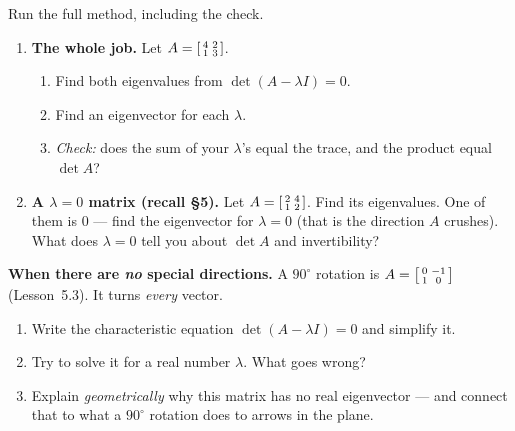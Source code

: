 \documentclass[10pt]{article}
\begin{document}
\begin{tcolorbox}[colback=white, colframe=black!40, title=\textbf{Tier A --- Approaching Proficiency},
    fonttitle=\bfseries, arc=1.5mm, left=3mm, right=3mm, top=2mm, bottom=2mm, breakable]
Run the full method, including the check.
\begin{enumerate}[leftmargin=1.7em, itemsep=9pt]
  \item \textbf{The whole job.} Let $A=\begin{bsmallmatrix} 4 & 2\\ 1 & 3 \end{bsmallmatrix}$.
        \begin{enumerate}[label=(\alph*), leftmargin=1.7em, itemsep=3pt]
          \item Find both eigenvalues from $\det(A-\lambda I)=0$.
          \item Find an eigenvector for each $\lambda$.
          \item \emph{Check:} does the sum of your $\lambda$'s equal the trace, and the product equal $\det A$?
        \end{enumerate}
  \item \textbf{A $\lambda=0$ matrix (recall §5).} Let $A=\begin{bsmallmatrix} 2 & 4\\ 1 & 2 \end{bsmallmatrix}$.
        Find its eigenvalues. One of them is $0$ --- find the eigenvector for $\lambda=0$ (that is the
        direction $A$ crushes). What does $\lambda=0$ tell you about $\det A$ and invertibility? 
\end{enumerate}
\end{tcolorbox}

\begin{tcolorbox}[colback=white, colframe=black!40, title=\textbf{Tier E --- Extension},
    fonttitle=\bfseries, arc=1.5mm, left=3mm, right=3mm, top=2mm, bottom=2mm, breakable]
\textbf{When there are \emph{no} special directions.} A $90^\circ$ rotation is
$A=\begin{bsmallmatrix} 0 & -1\\ 1 & 0 \end{bsmallmatrix}$ (Lesson~5.3). It turns \emph{every} vector.
\begin{enumerate}[leftmargin=1.7em, itemsep=9pt]
  \item Write the characteristic equation $\det(A-\lambda I)=0$ and simplify it. \writeline
  \item Try to solve it for a real number $\lambda$. What goes wrong? \writeline
  \item Explain \emph{geometrically} why this matrix has no real eigenvector --- and connect that to
        what a $90^\circ$ rotation does to arrows in the plane. 
\end{enumerate}
\end{tcolorbox}
\end{document}
